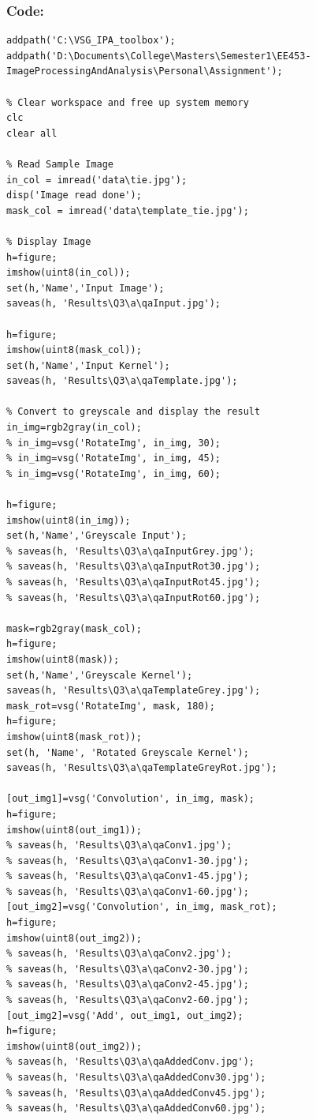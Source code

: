 \documentclass[a4paper]{article}
\begin{document}
	\subsubsection{Code:}
\begin{lstlisting}[caption={Part 3 a}]
	% Setup Paths to VSG Toolbox and Local Data
addpath('C:\VSG_IPA_toolbox');
addpath('D:\Documents\College\Masters\Semester1\EE453-ImageProcessingAndAnalysis\Personal\Assignment');

% Clear workspace and free up system memory
clc
clear all

% Read Sample Image
in_col = imread('data\tie.jpg');
disp('Image read done');
mask_col = imread('data\template_tie.jpg');

% Display Image
h=figure;
imshow(uint8(in_col));
set(h,'Name','Input Image');
saveas(h, 'Results\Q3\a\qaInput.jpg');

h=figure;
imshow(uint8(mask_col));
set(h,'Name','Input Kernel');
saveas(h, 'Results\Q3\a\qaTemplate.jpg');

% Convert to greyscale and display the result
in_img=rgb2gray(in_col);
% in_img=vsg('RotateImg', in_img, 30);
% in_img=vsg('RotateImg', in_img, 45);
% in_img=vsg('RotateImg', in_img, 60);

h=figure;
imshow(uint8(in_img));
set(h,'Name','Greyscale Input');
% saveas(h, 'Results\Q3\a\qaInputGrey.jpg');
% saveas(h, 'Results\Q3\a\qaInputRot30.jpg');
% saveas(h, 'Results\Q3\a\qaInputRot45.jpg');
% saveas(h, 'Results\Q3\a\qaInputRot60.jpg');

mask=rgb2gray(mask_col);
h=figure;
imshow(uint8(mask));
set(h,'Name','Greyscale Kernel');
saveas(h, 'Results\Q3\a\qaTemplateGrey.jpg');
mask_rot=vsg('RotateImg', mask, 180);
h=figure;
imshow(uint8(mask_rot));
set(h, 'Name', 'Rotated Greyscale Kernel');
saveas(h, 'Results\Q3\a\qaTemplateGreyRot.jpg');

[out_img1]=vsg('Convolution', in_img, mask);
h=figure;
imshow(uint8(out_img1));
% saveas(h, 'Results\Q3\a\qaConv1.jpg');
% saveas(h, 'Results\Q3\a\qaConv1-30.jpg');
% saveas(h, 'Results\Q3\a\qaConv1-45.jpg');
% saveas(h, 'Results\Q3\a\qaConv1-60.jpg');
[out_img2]=vsg('Convolution', in_img, mask_rot);
h=figure;
imshow(uint8(out_img2));
% saveas(h, 'Results\Q3\a\qaConv2.jpg');
% saveas(h, 'Results\Q3\a\qaConv2-30.jpg');
% saveas(h, 'Results\Q3\a\qaConv2-45.jpg');
% saveas(h, 'Results\Q3\a\qaConv2-60.jpg');
[out_img2]=vsg('Add', out_img1, out_img2);
h=figure;
imshow(uint8(out_img2));
% saveas(h, 'Results\Q3\a\qaAddedConv.jpg');
% saveas(h, 'Results\Q3\a\qaAddedConv30.jpg');
% saveas(h, 'Results\Q3\a\qaAddedConv45.jpg');
% saveas(h, 'Results\Q3\a\qaAddedConv60.jpg');


\end{lstlisting}
\end{document}
